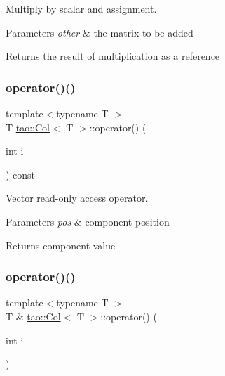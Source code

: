 Multiply by scalar and assignment. 


\begin{DoxyParams}{Parameters}
{\em other} & the matrix to be added \\
\hline
\end{DoxyParams}
\begin{DoxyReturn}{Returns}
the result of multiplication as a reference 
\end{DoxyReturn}
\mbox{\label{classtao_1_1_col_a7d08ac2d077bed978eb783b5fe707a7c}} 
\subsubsection{\texorpdfstring{operator()()}{operator()()}\hspace{0.1cm}{\footnotesize\ttfamily [1/2]}}
{\footnotesize\ttfamily template$<$typename T $>$ \\
T \mbox{\hyperlink{classtao_1_1_col}{tao\+::\+Col}}$<$ T $>$\+::operator() (\begin{DoxyParamCaption}\item[{int}]{i }\end{DoxyParamCaption}) const}



Vector read-\/only access operator. 


\begin{DoxyParams}{Parameters}
{\em pos} & component position \\
\hline
\end{DoxyParams}
\begin{DoxyReturn}{Returns}
component value 
\end{DoxyReturn}
\mbox{\label{classtao_1_1_col_ad7f3279e2764f5e1b0762e62517e738a}} 
\subsubsection{\texorpdfstring{operator()()}{operator()()}\hspace{0.1cm}{\footnotesize\ttfamily [2/2]}}
{\footnotesize\ttfamily template$<$typename T $>$ \\
T \& \mbox{\hyperlink{classtao_1_1_col}{tao\+::\+Col}}$<$ T $>$\+::operator() (\begin{DoxyParamCaption}\item[{int}]{i }\end{DoxyParamCaption})}



